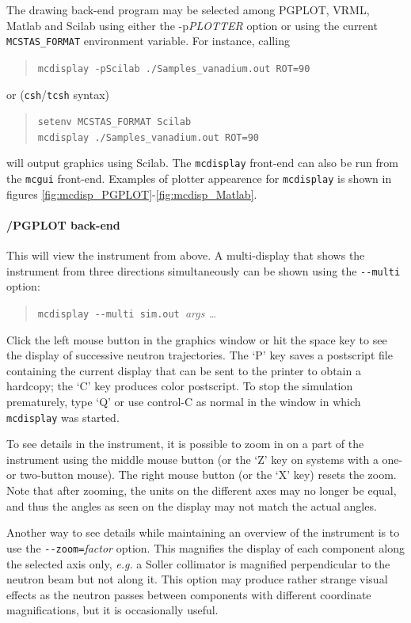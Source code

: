   
 The drawing back-end program may be selected among
PGPLOT, VRML, Matlab and Scilab using either the -p{\it PLOTTER} option or using
the current \verb+MCSTAS_FORMAT+ environment variable.  For instance, calling
\begin{quote}
  \verb+mcdisplay -pScilab ./Samples_vanadium.out ROT=90+
\end{quote}
or (\verb+csh+/\verb+tcsh+ syntax)
\begin{quote}
  \verb+setenv MCSTAS_FORMAT Scilab+\\
  \verb+mcdisplay ./Samples_vanadium.out ROT=90+
\end{quote}
will output graphics using Scilab.
The \verb+mcdisplay+ front-end can also be run from the \verb+mcgui+ front-end.
Examples of plotter appearence for \verb+mcdisplay+ is shown in figures
 \ref{fig:mcdisp_PGPLOT}-\ref{fig:mcdisp_Matlab}.

\paragraph{\MCS /PGPLOT back-end}

This will view the instrument from above. A multi-display that shows the
instrument from three directions simultaneously can be shown using the
\verb+--multi+ option:
\begin{quote}
  \verb+mcdisplay --multi sim.out +{\it args \ldots}
\end{quote}

Click the left mouse button in the graphics window or hit the space key to see
the display of successive neutron trajectories. The `P' key saves a postscript
file containing the current display that can be sent to the printer to obtain a
hardcopy; the `C' key produces color postscript.  To stop the simulation
prematurely, type `Q' or use control-C as normal in the window in which
\verb+mcdisplay+ was started.

To see details in the instrument, it is possible to zoom in on a part of the
instrument using the middle mouse button (or the `Z' key on systems with a one-
or two-button mouse). The right mouse button (or the `X' key) resets the
zoom. Note that after zooming, the units on the different axes may no longer be
equal, and thus the angles as seen on the display may not match the actual
angles.

Another way to see details while maintaining an overview of the instrument is to
use the \verb+--zoom=+\textit{factor} option. This magnifies the display of each
component along the selected axis only, {\em e.g.} a Soller collimator is
magnified perpendicular to the neutron beam but not along it. This option may
produce rather strange visual effects as the neutron passes between components
with different coordinate magnifications, but it is occasionally useful.

